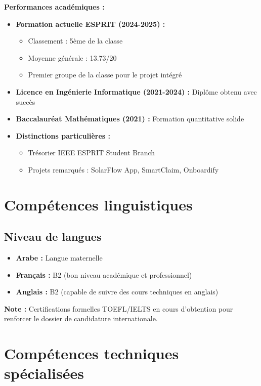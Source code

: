\documentclass[12pt,a4paper]{report}
\begin{document}
\textbf{Performances académiques :}
\begin{itemize}
    \item \textbf{Formation actuelle ESPRIT (2024-2025) :}
    \begin{itemize}
        \item Classement : 5ème de la classe
        \item Moyenne générale : 13.73/20
        \item Premier groupe de la classe pour le projet intégré
    \end{itemize}
    \item \textbf{Licence en Ingénierie Informatique (2021-2024) :} Diplôme obtenu avec succès
    \item \textbf{Baccalauréat Mathématiques (2021) :} Formation quantitative solide
    \item \textbf{Distinctions particulières :} 
    \begin{itemize}
        \item Trésorier IEEE ESPRIT Student Branch
        \item Projets remarqués : SolarFlow App, SmartClaim, Onboardify
    \end{itemize}
\end{itemize}

\section{Compétences linguistiques}

\subsection{Niveau de langues}
\begin{itemize}
    \item \textbf{Arabe :} Langue maternelle
    \item \textbf{Français :} B2 (bon niveau académique et professionnel)
    \item \textbf{Anglais :} B2 (capable de suivre des cours techniques en anglais)
\end{itemize}

\textbf{Note :} Certifications formelles TOEFL/IELTS en cours d'obtention pour renforcer le dossier de candidature internationale.

\section{Compétences techniques spécialisées}
\end{document}
